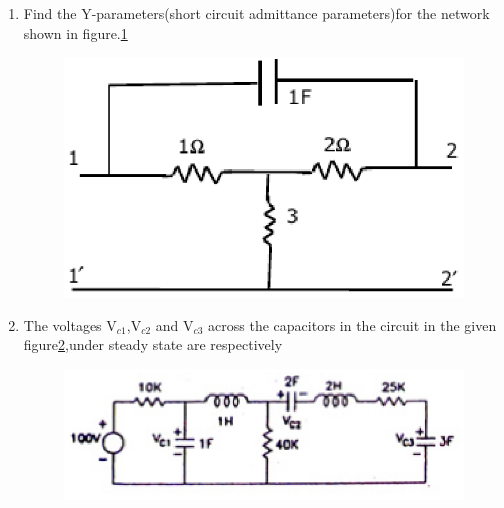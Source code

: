 \documentclass[journal,12pt,twocolumn]{IEEEtran}
\begin{document}
\begin{enumerate}
\item Find the Y-parameters(short circuit admittance parameters)for the network shown in figure.\ref{fig8}
\begin{figure}[!h]
\begin{center}
\includegraphics[scale=0.5]{./figs/fig8.eps}
\caption{}
\label{fig8}
\end{center}
\end{figure}


\item The voltages V$_{c1}$,V$_{c2}$ and V$_{c3}$ across the capacitors in the circuit in the given figure\ref{fig9},under steady state are respectively
\begin{enumerate}
\setlength\itemsep{2em}
\begin{figure}[!h]
\begin{center}
\includegraphics[scale=0.7]{./figs/fig9.eps}
\caption{}
\label{fig9}
\end{center}
\end{figure}
\end{enumerate}


\end{enumerate}
\end{document}
